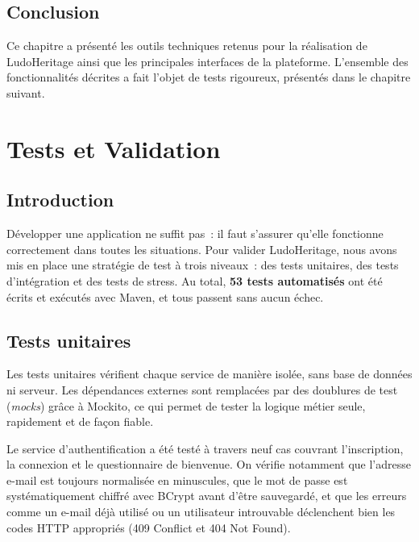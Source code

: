 \documentclass[12pt,a4paper]{report}
\begin{document}
\section{Conclusion}

Ce chapitre a présenté les outils techniques retenus pour la réalisation de LudoHeritage
ainsi que les principales interfaces de la plateforme. L'ensemble des fonctionnalités
décrites a fait l'objet de tests rigoureux, présentés dans le chapitre suivant.

\chapter{Tests et Validation}

\section{Introduction}

Développer une application ne suffit pas~: il faut s'assurer qu'elle fonctionne
correctement dans toutes les situations. Pour valider LudoHeritage, nous avons mis en
place une stratégie de test à trois niveaux~: des tests unitaires, des tests d'intégration
et des tests de stress. Au total, \textbf{53 tests automatisés} ont été écrits et
exécutés avec Maven, et tous passent sans aucun échec.

\section{Tests unitaires}

Les tests unitaires vérifient chaque service de manière isolée, sans base de données
ni serveur. Les dépendances externes sont remplacées par des doublures de test
(\textit{mocks}) grâce à Mockito, ce qui permet de tester la logique métier seule,
rapidement et de façon fiable.

Le service d'authentification a été testé à travers neuf cas couvrant l'inscription,
la connexion et le questionnaire de bienvenue. On vérifie notamment que l'adresse
e-mail est toujours normalisée en minuscules, que le mot de passe est systématiquement
chiffré avec BCrypt avant d'être sauvegardé, et que les erreurs comme un e-mail déjà
utilisé ou un utilisateur introuvable déclenchent bien les codes HTTP appropriés
(409 Conflict et 404 Not Found).
\end{document}
